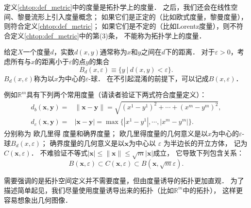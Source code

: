 定义\ref{chtop:def_metric}中的度量是拓扑学上的度量．
之后，我们还会在线性空间、黎曼流形上引入度量概念；
如果它们是正定的（比如欧式度量，黎曼度量），则符合定义\ref{chtop:def_metric}；
如果它们是不定的（比如Lorentz度量），则不符合定义\ref{chtop:def_metric}中的第(3)条，
不能称为拓扑学上的度量．



给定$X$一个度量$d$，实数$d(x,y)$通常称为$x$和$y$之间在$d$下的{\heiti 距离}．
对于$\varepsilon >0$，考虑所有与$x$的距离小于$\varepsilon$的点$y$的集合
\begin{equation}\label{chtop:eqn_eball}
    B_{d}(x,\varepsilon)\equiv \{y \ |\ d(x,y)<\varepsilon\} .
\end{equation}
$B_{d}(x,\varepsilon)$称为{\heiti 以$x$为中心的$\varepsilon$-球}．
在不引起混淆的前提下，可以记成$B(x,\varepsilon)$．

例如$\mathbb{R}^m$具有下列两个常用度量（请读者验证下两式符合度量定义）：
\begin{subequations}\label{chtop:eqn_Rdbc}
    \begin{align}
        d_b(\boldsymbol{x}, \boldsymbol{y})=& \|\boldsymbol{x}-\boldsymbol{y}\|
        =\sqrt{(x^1-y^1)^2+\cdots +(x^m-y^m)^2}, \label{chtop:eqn_Rdb} \\
        d_c(\boldsymbol{x}, \boldsymbol{y})=& |\boldsymbol{x}-\boldsymbol{y}|
        =\max\{|x^1-y^1|,\cdots,|x^m-y^m| \}. \label{chtop:eqn_Rdc}
    \end{align}
\end{subequations}
分别称为 欧几里得 度量和确界度量；
欧几里得度量的几何意义是以$x$为中心的$\varepsilon$-球$B_{d}(x,\varepsilon)$；
确界度量的几何意义是以$\boldsymbol{x}$为中心以 $\varepsilon$ 为半边长的开立方体，
记为$C(\boldsymbol{x} , \varepsilon)$．
不难验证不等式$|\boldsymbol{x}| \leqslant\|\boldsymbol{x}\| \leqslant \sqrt{m}|\boldsymbol{x}|$成立，
它导致下列包含关系：
\begin{equation}\label{chtop:eqn_BCB}
    B(\boldsymbol{x} , \varepsilon) \subset C(\boldsymbol{x} , \varepsilon)
     \subset B(\boldsymbol{x} , \sqrt{m} \varepsilon) .
\end{equation}

需要强调的是拓扑空间定义并不需要度量，但由度量诱导的拓扑更加直观．
为了描述简单起见，我们尽量使用度量诱导出来的拓扑（比如$\mathbb{R}^m$中的拓扑），
这样更容易想象出几何图像．

